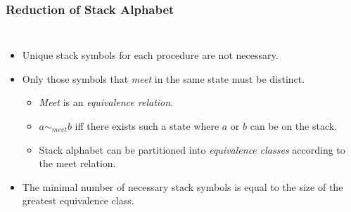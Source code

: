 \begin{frame}
  \frametitle{Reduction of Stack Alphabet}
  \begin{columns}
    \begin{itemize}
      \item Unique stack symbols for each procedure are not necessary.\justifying\vspace*{0.5em}
      \item Only those symbols that \emph{meet} in the same state must be distinct.\justifying
        \begin{itemize}
          \item<2-> \emph{Meet} is an \emph{equivalence relation}.
          \item<2-> $a\sim_{meet}b$ iff there exists such a state where $a$ or $b$ can be on the stack.\justifying
          \item<2-> Stack \hspace*{0.1ex}alphabet\hspace*{0.1ex} can \hspace*{0.1ex}be \hspace*{0.1ex}partitioned into \emph{equivalence classes} according to the meet relation.\justifying
        \end{itemize}
      \vspace*{0.3em}
      \item<3-> The minimal number of necessary stack symbols is equal to the size of the greatest equivalence class.\justifying
    \end{itemize}


\end{columns}
\end{frame}
